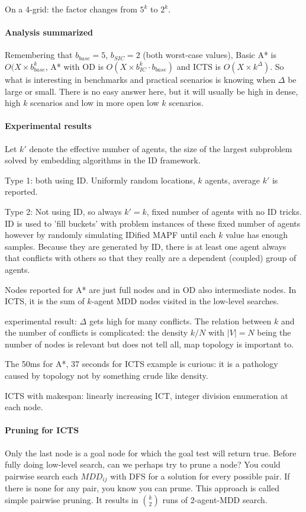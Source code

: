 \documentclass[a4paper,10pt,english]{article}
\begin{document}
	On a 4-grid: the factor changes from $5^k$ to $2^k$.
	
	\paragraph{Analysis summarized}
	Remembering that $b_{base} = 5$, $b_{SIC} = 2$ (both worst-case values),
	Basic A* is $O(X\times b^k_{base}$, A* with OD is $O(X\times b_{IC}^k\cdot b_{base})$ and ICTS is $O(X\times k^\Delta)$. So what is interesting in benchmarks and practical scenarios is knowing when $\Delta$ be large or small. There is no easy answer here, but it will usually be high in dense, high $k$ scenarios and low in more open low $k$ scenarios.
	
	\paragraph{Experimental results}
	Let $k'$ denote the effective number of agents, the size of the largest subproblem solved by embedding algorithms in the ID framework.
	
	Type 1: both using ID. Uniformly random locations, $k$ agents, average $k'$ is reported.
	
	Type 2: Not using ID, so always $k' = k$, fixed number of agents with no ID tricks. ID is used to 'fill buckets' with problem instances of these fixed number of agents however by randomly simulating IDified MAPF until each $k$ value has enough samples. Because they are generated by ID, there is at least one agent always that conflicts with others so that they really are a dependent (coupled) group of agents.
	
	Nodes reported for A* are just full nodes and in OD also intermediate nodes. In ICTS, it is the sum of $k$-agent MDD nodes visited in the low-level searches.
	
	experimental result: $\Delta$ gets high for many conflicts. The relation between $k$ and the number of conflicts is complicated: the density $k/N$ with $|V| = N$ being the number of nodes is relevant but does not tell all, map topology is important to.
	
	The 50ms for A*, 37 seconds for ICTS example is curious: it is a pathology caused by topology not by something crude like density.
	
	ICTS with makespan: linearly increasing ICT, integer division enumeration at each node.
	\paragraph{Pruning for ICTS}
	Only the last node is a goal node for which the goal test will return true. Before fully doing low-level search, can we perhaps try to prune a node? You could pairwise search each $MDD_{ij}$ with DFS for a solution for every possible pair. If there is none for any pair, you know you can prune. This approach is called simple pairwise pruning. It results in $k \choose 2$ runs of 2-agent-MDD search.
	
\end{document}
